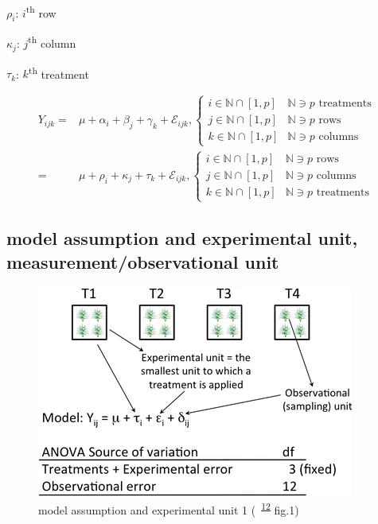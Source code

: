 \documentclass[
]{book}
\theoremstyle{definition}
\theoremstyle{definition}
\theoremstyle{definition}
\theoremstyle{definition}
\theoremstyle{remark}
\begin{document}
\(\rho_{{\scriptscriptstyle i}}\): \(i\)\textsuperscript{th} row

\(\kappa_{{\scriptscriptstyle j}}\): \(j\)\textsuperscript{th} column

\(\tau_{{\scriptscriptstyle k}}\): \(k\)\textsuperscript{th} treatment

\[
\begin{aligned}
Y_{{\scriptscriptstyle ijk}}= & \mu+\alpha_{{\scriptscriptstyle i}}+\beta_{{\scriptscriptstyle j}}+\gamma_{{\scriptscriptstyle k}}+\mathcal{E}_{{\scriptscriptstyle ijk}},\begin{cases}
i\in\mathbb{N}\cap\left[1,p\right] & \mathbb{N}\ni p\text{ treatments}\\
j\in\mathbb{N}\cap\left[1,p\right] & \mathbb{N}\ni p\text{ rows}\\
k\in\mathbb{N}\cap\left[1,p\right] & \mathbb{N}\ni p\text{ columns}
\end{cases}\\
= & \mu+\rho_{{\scriptscriptstyle i}}+\kappa_{{\scriptscriptstyle j}}+\tau_{{\scriptscriptstyle k}}+\mathcal{E}_{{\scriptscriptstyle ijk}},\begin{cases}
i\in\mathbb{N}\cap\left[1,p\right] & \mathbb{N}\ni p\text{ rows}\\
j\in\mathbb{N}\cap\left[1,p\right] & \mathbb{N}\ni p\text{ columns}\\
k\in\mathbb{N}\cap\left[1,p\right] & \mathbb{N}\ni p\text{ treatments}
\end{cases}
\end{aligned}
\]

\hypertarget{model-assumption-and-experimental-unit-measurementobservational-unit}{%
\subsection{model assumption and experimental unit, measurement/observational unit}\label{model-assumption-and-experimental-unit-measurementobservational-unit}}



\begin{figure}
\includegraphics[width=0.5\linewidth]{img/casler2015-fig1} \caption{model assumption and experimental unit 1 (~\textsuperscript{\protect\hyperlink{ref-casler2015}{12}} fig.1)}\label{fig:unnamed-chunk-3}
\end{figure}
\end{document}
